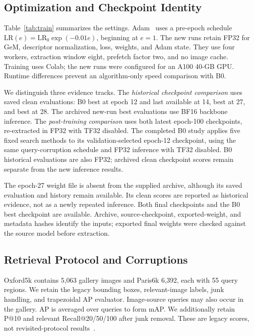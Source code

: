 \subsection{Optimization and Checkpoint Identity}
Table~\ref{tab:train} summarizes the settings. Adam~\cite{adam} uses a pre-epoch schedule $\mathrm{LR}(e)=\mathrm{LR}_0\exp(-0.01e)$, beginning at $e=1$. The new runs retain FP32 for GeM, descriptor normalization, loss, weights, and Adam state. They use four workers, extraction window eight, prefetch factor two, and no image cache. Training uses Colab; the new runs were configured for an A100 40-GB GPU. Runtime differences prevent an algorithm-only speed comparison with B0.

We distinguish three evidence tracks. The \emph{historical checkpoint comparison} uses saved clean evaluations: B0 best at epoch 12 and last available at 14, \Rone{} best at 27, and \Rtwo{} best at 28. The archived new-run best evaluations use BF16 backbone inference. The \emph{post-training comparison} uses both latest epoch-100 checkpoints, re-extracted in FP32 with TF32 disabled. The completed B0 study applies five fixed search methods to its validation-selected epoch-12 checkpoint, using the same query-corruption schedule and FP32 inference with TF32 disabled. B0 historical evaluations are also FP32; archived clean checkpoint scores remain separate from the new inference results.

The \Rone{} epoch-27 weight file is absent from the supplied archive, although its saved evaluation and history remain available. Its clean scores are reported as historical evidence, not as a newly repeated inference. Both final checkpoints and the B0 best checkpoint are available. Archive, source-checkpoint, exported-weight, and metadata hashes identify the inputs; exported final weights were checked against the source model before extraction.

\subsection{Retrieval Protocol and Corruptions}
Oxford5k contains 5,063 gallery images and Paris6k 6,392, each with 55 query regions. We retain the legacy bounding boxes, relevant-image labels, junk handling, and trapezoidal AP evaluator. Image-source queries may also occur in the gallery. AP is averaged over queries to form mAP. We additionally retain P@10 and relevant Recall@20/50/100 after junk removal. These are legacy scores, not revisited-protocol results~\cite{revisited}.

